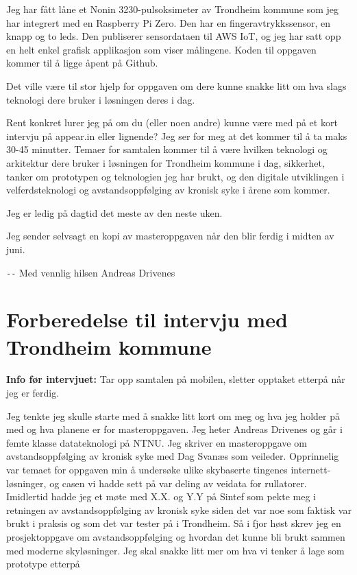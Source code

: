 Jeg har fått låne et Nonin 3230-pulsoksimeter av Trondheim kommune som jeg har integrert med en Raspberry Pi Zero.
Den har en fingeravtrykkssensor, en knapp og to leds. Den publiserer sensordataen til AWS IoT, og jeg har satt opp en helt
enkel grafisk applikasjon som viser målingene. Koden til oppgaven kommer til å ligge åpent på Github.

Det ville være til stor hjelp for oppgaven om dere kunne snakke litt om hva slags teknologi dere bruker i løsningen deres i dag.

Rent konkret lurer jeg på om du (eller noen andre) kunne være med på et kort intervju på appear.in eller lignende? 
Jeg ser for meg at det kommer til å ta maks 30-45 minutter. Temaer for samtalen kommer til å være hvilken teknologi og arkitektur
dere bruker i løsningen for Trondheim kommune i dag, sikkerhet, tanker om prototypen og teknologien jeg har brukt, og den
digitale utviklingen i velferdsteknologi og avstandsoppfølging av kronisk syke i årene som kommer.

Jeg er ledig på dagtid det meste av den neste uken.

Jeg sender selvsagt en kopi av masteroppgaven når den blir ferdig i midten av juni.

\verb|--| \newline
Med vennlig hilsen \newline
Andreas Drivenes \newline

\chapter{Forberedelse til intervju med Trondheim kommune}
\label{appendix:forberedelse}
\textbf{Info før intervjuet:}
Tar opp samtalen på mobilen, sletter opptaket etterpå når jeg er ferdig. 
 
Jeg tenkte jeg skulle starte med å snakke litt kort om meg og hva jeg holder på med og hva planene er for masteroppgaven. Jeg heter Andreas Drivenes og går i femte klasse
datateknologi på NTNU. Jeg skriver en masteroppgave om avstandsoppfølging av kronisk syke med Dag Svanæs som veileder. Opprinnelig var temaet for oppgaven min å undersøke
ulike skybaserte tingenes internett-løsninger, og casen vi hadde sett på var deling av veidata for rullatorer. Imidlertid hadde jeg et møte med X.X. og Y.Y på Sintef som pekte meg i retningen av avstandsoppfølging av kronisk syke siden det var noe som faktisk var brukt i praksis og som det var tester på i Trondheim. Så i fjor høst skrev jeg en prosjektoppgave om avstandsoppfølging og hvordan det kunne bli brukt sammen med moderne skyløsninger. Jeg skal snakke litt mer om hva vi tenker å lage som prototype etterpå
 
